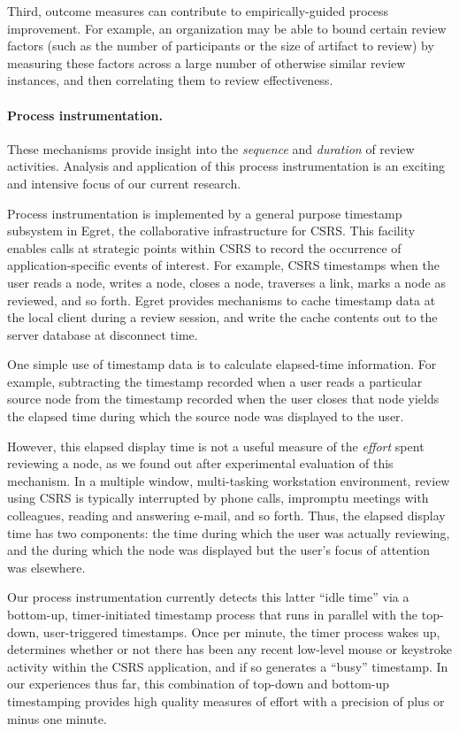 Third, outcome measures can contribute to empirically-guided process
improvement.  For example, an organization may be able to bound certain
review factors (such as the number of participants or the size of artifact
to review) by measuring these factors across a large number of otherwise
similar review instances, and then correlating them to review
effectiveness.

\paragraph{Process instrumentation.} 

These mechanisms provide insight into the {\em sequence}\/ and {\em
duration}\/ of review activities.  Analysis and application of this
process instrumentation is an exciting and intensive focus of our current
research.

Process instrumentation is implemented by a general purpose timestamp
subsystem in Egret, the collaborative infrastructure for CSRS.  This
facility enables calls at strategic points within CSRS to record the
occurrence of application-specific events of interest. For example, CSRS
timestamps when the user reads a node, writes a node, closes a node,
traverses a link, marks a node as reviewed, and so forth.  Egret provides
mechanisms to cache timestamp data at the local client during a review
session, and write the cache contents out to the server database at
disconnect time.

One simple use of timestamp data is to calculate elapsed-time
information.  For example, subtracting the timestamp recorded when a
user reads a particular source node from the timestamp recorded when
the user closes that node yields the elapsed time during which the
source node was displayed to the user.

However, this elapsed display time is not a useful measure of the {\em
effort} spent reviewing a node, as we found out after experimental
evaluation of this mechanism.  In a multiple window, multi-tasking
workstation environment, review using CSRS is typically interrupted by
phone calls, impromptu meetings with colleagues, reading and
answering e-mail, and so forth. Thus, the elapsed display time has two
components: the time during which the user was actually reviewing, and
the during which the node was displayed but the user's focus of
attention was elsewhere.

Our process instrumentation currently detects this latter ``idle
time'' via a bottom-up, timer-initiated timestamp process that runs in
parallel with the top-down, user-triggered timestamps.  Once per
minute, the timer process wakes up, determines whether or not there
has been any recent low-level mouse or keystroke activity within the
CSRS application, and if so generates a ``busy'' timestamp. In our
experiences thus far, this combination of top-down and bottom-up
timestamping provides high quality measures of effort with a precision
of plus or minus one minute.

